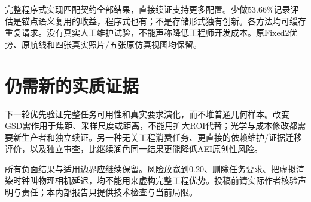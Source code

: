 \documentclass[UTF8,a4paper,11pt,fontset=fandol]{ctexart}
\begin{document}
完整程序式实现匹配契约全部结果，直接续证支持更多配置。少做53.66\%记录评估是锚点语义复用的收益，程序式也有；不是存储形式独有创新。各方法均可缓存重复请求。没有真实人工维护试验，不能声称降低工程师开发成本。原Fixed2优势、原航线和四张真实照片/五张原仿真视图均保留。

\section{仍需新的实质证据}
下一轮优先验证完整任务可用性和真实要求演化，而不堆普通几何样本。改变GSD需作用于焦距、采样尺度或距离，不能用扩大ROI代替；光学与成本修改都需要新生产者和独立续证。另一种无关工程消费任务、更直接的依赖维护/证据迁移评价，以及独立审查，比继续润色同一结果更能降低AEI原创性风险。

所有负面结果与适用边界应继续保留。风险放宽到0.20、删除任务要求、把虚拟渲染时钟叫物理相机延迟，均不能用来虚构完整工程优势。投稿前请实际作者核验声明与责任；本内部报告只提供技术检查与当前局限。
\end{document}
